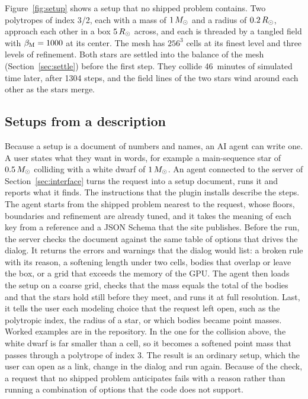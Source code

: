 \documentclass[twocolumn]{aastex701}
\begin{document}
Figure~\ref{fig:setup} shows a setup that no shipped problem contains. Two polytropes of index 3/2, each with a mass of $1\,M_\odot$ and a radius of $0.2\,R_\odot$, approach each other in a box $5\,R_\odot$ across, and each is threaded by a tangled field with $\beta_{\rm M} = 1000$ at its center. The mesh has $256^3$ cells at its finest level and three levels of refinement. Both stars are settled into the balance of the mesh (Section~\ref{sec:settle}) before the first step. They collide 46~minutes of simulated time later, after 1304 steps, and the field lines of the two stars wind around each other as the stars merge.

\subsection{Setups from a description}
\label{sec:agents}

Because a setup is a document of numbers and names, an AI agent can write one. A user states what they want in words, for example a main-sequence star of $0.5\,M_\odot$ colliding with a white dwarf of $1\,M_\odot$. An agent connected to the server of Section~\ref{sec:interface} turns the request into a setup document, runs it and reports what it finds. The instructions that the plugin installs describe the steps. The agent starts from the shipped problem nearest to the request, whose floors, boundaries and refinement are already tuned, and it takes the meaning of each key from a reference and a JSON Schema that the site publishes. Before the run, the server checks the document against the same table of options that drives the dialog. It returns the errors and warnings that the dialog would list: a broken rule with its reason, a softening length under two cells, bodies that overlap or leave the box, or a grid that exceeds the memory of the GPU. The agent then loads the setup on a coarse grid, checks that the mass equals the total of the bodies and that the stars hold still before they meet, and runs it at full resolution. Last, it tells the user each modeling choice that the request left open, such as the polytropic index, the radius of a star, or which bodies became point masses. Worked examples are in the repository. In the one for the collision above, the white dwarf is far smaller than a cell, so it becomes a softened point mass that passes through a polytrope of index 3. The result is an ordinary setup, which the user can open as a link, change in the dialog and run again. Because of the check, a request that no shipped problem anticipates fails with a reason rather than running a combination of options that the code does not support.
\end{document}
